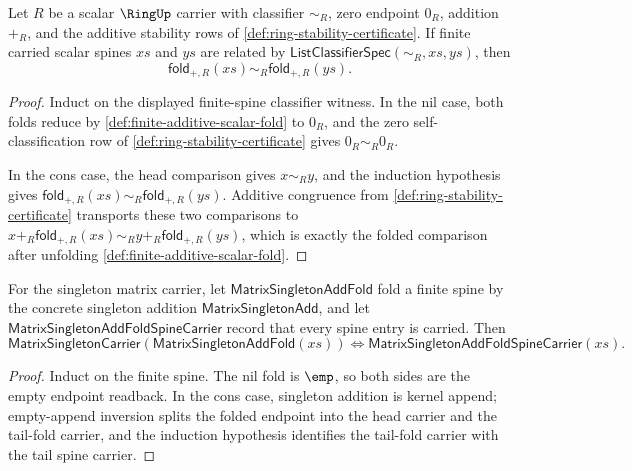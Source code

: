 \begin{theorem}
\label{thm:finite-additive-fold-respects-scalar-classifier}
Let $R$ be a scalar $\RingUp$ carrier with classifier $\sim_R$, zero endpoint
$0_R$, addition $+_R$, and the additive stability rows of
\autoref{def:ring-stability-certificate}. If finite carried scalar spines $xs$
and $ys$ are related by
$\mathsf{ListClassifierSpec}(\sim_R,xs,ys)$, then
$$
\mathsf{fold}_{+,R}(xs)\sim_R\mathsf{fold}_{+,R}(ys).
$$
\end{theorem}
\begin{proof}
Induct on the displayed finite-spine classifier witness. In the nil case, both
folds reduce by \autoref{def:finite-additive-scalar-fold} to $0_R$, and the
zero self-classification row of \autoref{def:ring-stability-certificate} gives
$0_R\sim_R0_R$.

In the cons case, the head comparison gives $x\sim_R y$, and the induction
hypothesis gives
$\mathsf{fold}_{+,R}(xs)\sim_R\mathsf{fold}_{+,R}(ys)$. Additive congruence from
\autoref{def:ring-stability-certificate} transports these two comparisons to
$x+_R\mathsf{fold}_{+,R}(xs)\sim_R y+_R\mathsf{fold}_{+,R}(ys)$, which is exactly
the folded comparison after unfolding
\autoref{def:finite-additive-scalar-fold}.
\end{proof}

\begin{theorem}
\label{thm:matrix-singleton-add-fold-carrier-iff}
For the singleton matrix carrier, let
$\mathsf{MatrixSingletonAddFold}$ fold a finite spine by the concrete
singleton addition $\mathsf{MatrixSingletonAdd}$, and let
$\mathsf{MatrixSingletonAddFoldSpineCarrier}$ record that every spine entry
is carried. Then
$$
\mathsf{MatrixSingletonCarrier}(\mathsf{MatrixSingletonAddFold}(xs))
\Longleftrightarrow
\mathsf{MatrixSingletonAddFoldSpineCarrier}(xs).
$$
\end{theorem}
\begin{proof}
Induct on the finite spine. The nil fold is $\emp$, so both sides are the
empty endpoint readback. In the cons case, singleton addition is kernel
append; empty-append inversion splits the folded endpoint into the head
carrier and the tail-fold carrier, and the induction hypothesis identifies the
tail-fold carrier with the tail spine carrier.
\end{proof}

